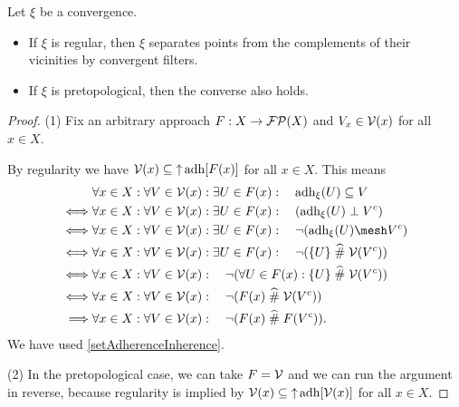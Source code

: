 \begin{proposition} \label{regularityBySeparation}
Let $\xi$ be a convergence.
\begin{itemize}
\item If $\xi$ is regular, then $\xi$ separates points from the complements of their vicinities by convergent filters.
\item If $\xi$ is pretopological, then the converse also holds.
\end{itemize}
\end{proposition}
\begin{proof}
(1) Fix an arbitrary approach $F: X\to \operatorname{\mathcal{FP}}(X)$ and $V_x\in \operatorname{\mathcal{V}}(x)$ for all $x\in X$.

By regularity we have $\operatorname{\mathcal{V}}(x)\subseteq \operatorname{\uparrow}\operatorname{adh}[F(x)]$ for all $x\in X$.
This means
\begin{align*}
& \forall x\in X: \forall V\in \vicinity(x): \exists U \in F(x): \quad \adh_\xi(U) \subseteq V \\
\iff& \forall x\in X: \forall V\in \vicinity(x): \exists U \in F(x): \quad (\adh_\xi(U) \perp V^c) \\
\iff& \forall x\in X: \forall V\in \vicinity(x): \exists U \in F(x): \quad \neg(\adh_\xi(U) \mesh V^c) \\
\iff& \forall x\in X: \forall V\in \vicinity(x): \exists U \in F(x): \quad \neg(\{U\} \amesh \vicinity(V^c)) \\
\iff& \forall x\in X: \forall V\in \vicinity(x): \quad \neg(\forall U \in F(x):\{U\} \amesh \vicinity(V^c)) \\
\iff& \forall x\in X: \forall V\in \vicinity(x): \quad \neg(F(x) \amesh \vicinity(V^c)) \\
\implies& \forall x\in X: \forall V\in \vicinity(x): \quad \neg(F(x) \amesh F(V^c)).
\end{align*}
We have used \ref{setAdherenceInherence}.

(2) In the pretopological case, we can take $F = \operatorname{\mathcal{V}}$ and we can run the argument in reverse, because regularity is implied by $\operatorname{\mathcal{V}}(x)\subseteq \operatorname{\uparrow}\operatorname{adh}[\operatorname{\mathcal{V}}(x)]$ for all $x\in X$.
\end{proof}

